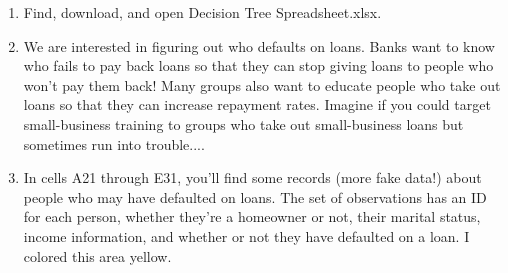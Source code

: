 \documentclass[10pt]{article}
\begin{document}
\begin{enumerate}
\item Find, download, and open Decision Tree Spreadsheet.xlsx.
\item We are interested in figuring out who defaults on loans. Banks want to know who fails to pay back loans so that they can stop giving loans to people who won't pay them back! Many groups also want to educate people who take out loans so that they can increase repayment rates. Imagine if you could target small-business training to groups who take out small-business loans but sometimes run into trouble....
\item In cells A21 through E31, you'll find some records (more fake data!) about people who may have defaulted on loans. The set of observations has an ID for each person, whether they're a homeowner or not, their marital status, income information, and whether or not they have defaulted on a loan. I colored this area yellow.


\end{enumerate}
\end{document}
